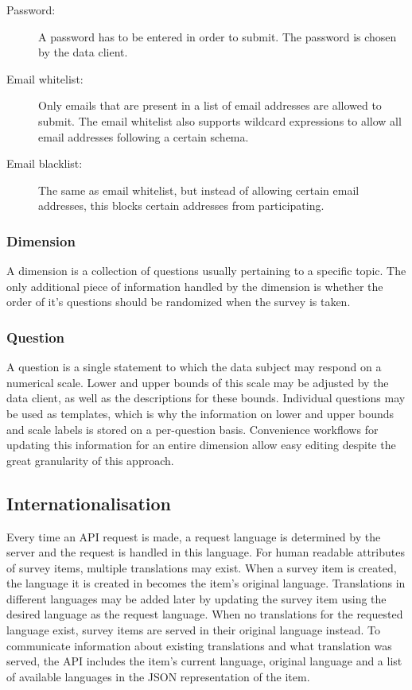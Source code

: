         \begin{description}
            \item[Password:] A password has to be entered in order to submit.
            The password is chosen by the data client.
            \item[Email whitelist:] Only emails that are present in a list
            of email addresses are allowed to submit. The email whitelist
            also supports wildcard expressions to allow all email addresses
            following a certain schema.
            \item[Email blacklist:] The same as email whitelist, but instead
            of allowing certain email addresses, this blocks certain addresses
            from participating.
        \end{description}
        
    \subsubsection{Dimension}
        A dimension is a collection of questions usually pertaining to
        a specific topic. The only additional piece of information
        handled by the dimension is whether the order of it's questions
        should be randomized when the survey is taken.

    \subsubsection{Question}
        A question is a single statement to which the data subject may respond
        on a numerical scale. Lower and upper bounds of this scale
        may be adjusted by the data client, as well as the descriptions
        for these bounds. Individual questions may be used as templates,
        which is why the information on lower and upper bounds and scale
        labels is stored on a per-question basis. Convenience workflows
        for updating this information for an entire dimension allow
        easy editing despite the great granularity of this approach.

\subsection{Internationalisation}
    Every time an API request is made,
    a request language is determined by the server and the request is
    handled in this language.
    For human readable attributes of survey items, multiple translations
    may exist. When a survey item is created, the language it is created
    in becomes the item's original language. Translations in different
    languages may be added later by updating the survey item using 
    the desired language as the request language. 
    When no translations for the requested language exist, survey items 
    are served in their original language instead.
    To communicate information about existing translations and
    what translation was served, the API includes the item's
    current language, original language and a list of available languages
    in the JSON representation of the item.

